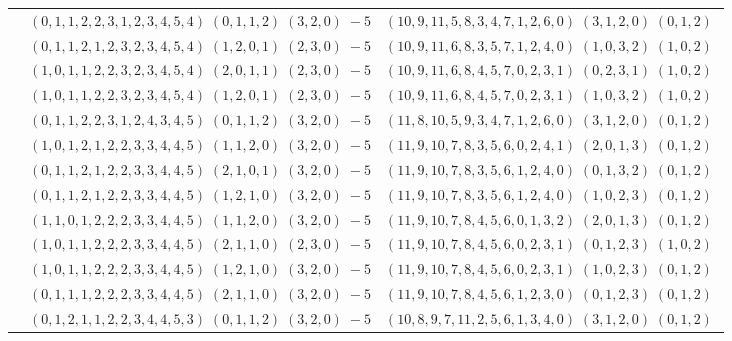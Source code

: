 \documentclass[11pt]{article}
\begin{document}
\begin{longtable}[l]{|c|c|c|}
 \cline{2-3} 
 & $(0 ,1 ,1 ,2 ,2 ,3 ,1 ,2 ,3 ,4 ,5 ,4) \;(0 ,1 ,1 ,2) \;(3 ,2 ,0) \;-5$ & $(10 ,9 ,11 ,5 ,8 ,3 ,4 ,7 ,1 ,2 ,6 ,0) \;(3 ,1 ,2 ,0) \;(0 ,1 ,2) \;$\\ 
 \cline{2-3} 
 & $(0 ,1 ,1 ,2 ,1 ,2 ,3 ,2 ,3 ,4 ,5 ,4) \;(1 ,2 ,0 ,1) \;(2 ,3 ,0) \;-5$ & $(10 ,9 ,11 ,6 ,8 ,3 ,5 ,7 ,1 ,2 ,4 ,0) \;(1 ,0 ,3 ,2) \;(1 ,0 ,2) \;$\\ 
 \cline{2-3} 
 & $(1 ,0 ,1 ,1 ,2 ,2 ,3 ,2 ,3 ,4 ,5 ,4) \;(2 ,0 ,1 ,1) \;(2 ,3 ,0) \;-5$ & $(10 ,9 ,11 ,6 ,8 ,4 ,5 ,7 ,0 ,2 ,3 ,1) \;(0 ,2 ,3 ,1) \;(1 ,0 ,2) \;$\\ 
 \cline{2-3} 
 & $(1 ,0 ,1 ,1 ,2 ,2 ,3 ,2 ,3 ,4 ,5 ,4) \;(1 ,2 ,0 ,1) \;(2 ,3 ,0) \;-5$ & $(10 ,9 ,11 ,6 ,8 ,4 ,5 ,7 ,0 ,2 ,3 ,1) \;(1 ,0 ,3 ,2) \;(1 ,0 ,2) \;$\\ 
 \cline{2-3} 
 & $(0 ,1 ,1 ,2 ,2 ,3 ,1 ,2 ,4 ,3 ,4 ,5) \;(0 ,1 ,1 ,2) \;(3 ,2 ,0) \;-5$ & $(11 ,8 ,10 ,5 ,9 ,3 ,4 ,7 ,1 ,2 ,6 ,0) \;(3 ,1 ,2 ,0) \;(0 ,1 ,2) \;$\\ 
 \cline{2-3} 
 & $(1 ,0 ,1 ,2 ,1 ,2 ,2 ,3 ,3 ,4 ,4 ,5) \;(1 ,1 ,2 ,0) \;(3 ,2 ,0) \;-5$ & $(11 ,9 ,10 ,7 ,8 ,3 ,5 ,6 ,0 ,2 ,4 ,1) \;(2 ,0 ,1 ,3) \;(0 ,1 ,2) \;$\\ 
 \cline{2-3} 
 & $(0 ,1 ,1 ,2 ,1 ,2 ,2 ,3 ,3 ,4 ,4 ,5) \;(2 ,1 ,0 ,1) \;(3 ,2 ,0) \;-5$ & $(11 ,9 ,10 ,7 ,8 ,3 ,5 ,6 ,1 ,2 ,4 ,0) \;(0 ,1 ,3 ,2) \;(0 ,1 ,2) \;$\\ 
 \cline{2-3} 
 & $(0 ,1 ,1 ,2 ,1 ,2 ,2 ,3 ,3 ,4 ,4 ,5) \;(1 ,2 ,1 ,0) \;(3 ,2 ,0) \;-5$ & $(11 ,9 ,10 ,7 ,8 ,3 ,5 ,6 ,1 ,2 ,4 ,0) \;(1 ,0 ,2 ,3) \;(0 ,1 ,2) \;$\\ 
 \cline{2-3} 
 & $(1 ,1 ,0 ,1 ,2 ,2 ,2 ,3 ,3 ,4 ,4 ,5) \;(1 ,1 ,2 ,0) \;(3 ,2 ,0) \;-5$ & $(11 ,9 ,10 ,7 ,8 ,4 ,5 ,6 ,0 ,1 ,3 ,2) \;(2 ,0 ,1 ,3) \;(0 ,1 ,2) \;$\\ 
 \cline{2-3} 
 & $(1 ,0 ,1 ,1 ,2 ,2 ,2 ,3 ,3 ,4 ,4 ,5) \;(2 ,1 ,1 ,0) \;(2 ,3 ,0) \;-5$ & $(11 ,9 ,10 ,7 ,8 ,4 ,5 ,6 ,0 ,2 ,3 ,1) \;(0 ,1 ,2 ,3) \;(1 ,0 ,2) \;$\\ 
 \cline{2-3} 
 & $(1 ,0 ,1 ,1 ,2 ,2 ,2 ,3 ,3 ,4 ,4 ,5) \;(1 ,2 ,1 ,0) \;(3 ,2 ,0) \;-5$ & $(11 ,9 ,10 ,7 ,8 ,4 ,5 ,6 ,0 ,2 ,3 ,1) \;(1 ,0 ,2 ,3) \;(0 ,1 ,2) \;$\\ 
 \cline{2-3} 
 & $(0 ,1 ,1 ,1 ,2 ,2 ,2 ,3 ,3 ,4 ,4 ,5) \;(2 ,1 ,1 ,0) \;(3 ,2 ,0) \;-5$ & $(11 ,9 ,10 ,7 ,8 ,4 ,5 ,6 ,1 ,2 ,3 ,0) \;(0 ,1 ,2 ,3) \;(0 ,1 ,2) \;$\\ 
 \cline{2-3} 
 & $(0 ,1 ,2 ,1 ,1 ,2 ,2 ,3 ,4 ,4 ,5 ,3) \;(0 ,1 ,1 ,2) \;(3 ,2 ,0) \;-5$ & $(10 ,8 ,9 ,7 ,11 ,2 ,5 ,6 ,1 ,3 ,4 ,0) \;(3 ,1 ,2 ,0) \;(0 ,1 ,2) \;$\\ 

\end{longtable}
\end{document}
